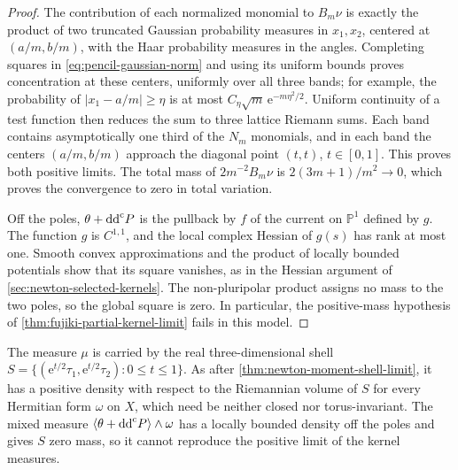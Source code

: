 \begin{proof}
The contribution of each normalized monomial to $B_m\nu$ is exactly the product of two truncated Gaussian probability measures in $x_1,x_2$, centered at $(a/m,b/m)$, with the Haar probability measures in the angles. Completing squares in \eqref{eq:pencil-gaussian-norm} and using its uniform bounds proves concentration at these centers, uniformly over all three bands; for example, the probability of $|x_1-a/m|\geq\eta$ is at most $C_\eta\sqrt m\,\mathrm e^{-m\eta^2/2}$. Uniform continuity of a test function then reduces the sum to three lattice Riemann sums. Each band contains asymptotically one third of the $N_m$ monomials, and in each band the centers $(a/m,b/m)$ approach the diagonal point $(t,t)$, $t\in[0,1]$. This proves both positive limits. The total mass of $2m^{-2}B_m\nu$ is $2(3m+1)/m^2\to0$, which proves the convergence to zero in total variation.

Off the poles, $\theta+\mathrm{dd}^{\mathrm{c}} P$ is the pullback by $f$ of the current on $\mathbb P^1$ defined by $g$. The function $g$ is $C^{1,1}$, and the local complex Hessian of $g(s)$ has rank at most one. Smooth convex approximations and the product of locally bounded potentials show that its square vanishes, as in the Hessian argument of \cref{sec:newton-selected-kernels}. The non-pluripolar product assigns no mass to the two poles, so the global square is zero. In particular, the positive-mass hypothesis of \cref{thm:fujiki-partial-kernel-limit} fails in this model.
\end{proof}

\enlargethispage{2\baselineskip}
The measure $\mu$ is carried by the real three-dimensional shell $S=\{(\mathrm e^{t/2}\tau_1,\mathrm e^{t/2}\tau_2):0\leq t\leq1\}$. As after \cref{thm:newton-moment-shell-limit}, it has a positive density with respect to the Riemannian volume of $S$ for every Hermitian form $\omega$ on $X$, which need be neither closed nor torus-invariant. The mixed measure $\langle\theta+\mathrm{dd}^{\mathrm{c}} P\rangle\wedge\omega$ has a locally bounded density off the poles and gives $S$ zero mass, so it cannot reproduce the positive limit of the kernel measures.

